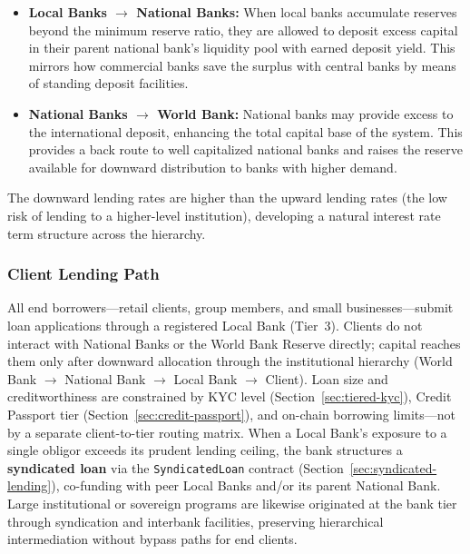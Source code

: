 \documentclass[12pt,a4paper]{report}
\begin{document}
\begin{itemize}[noitemsep]
\item \textbf{Local Banks $\to$ National Banks:} When local banks accumulate reserves beyond the minimum reserve ratio, they are allowed to deposit excess capital in their parent national bank's liquidity pool with earned deposit yield. This mirrors how commercial banks save the surplus with central banks by means of standing deposit facilities.
\item \textbf{National Banks $\to$ World Bank:} National banks may provide excess to the international deposit, enhancing the total capital base of the system. This provides a back route to well capitalized national banks and raises the reserve available for downward distribution to banks with higher demand.
\end{itemize}

The downward lending rates are higher than the upward lending rates (the low risk of lending to a higher-level institution), developing a natural interest rate term structure across the hierarchy.

\subsubsection{Client Lending Path}

All end borrowers---retail clients, group members, and small businesses---submit loan applications through a registered Local Bank (Tier~3). Clients do not interact with National Banks or the World Bank Reserve directly; capital reaches them only after downward allocation through the institutional hierarchy (World Bank $\to$ National Bank $\to$ Local Bank $\to$ Client). Loan size and creditworthiness are constrained by KYC level (Section~\ref{sec:tiered-kyc}), Credit Passport tier (Section~\ref{sec:credit-passport}), and on-chain borrowing limits---not by a separate client-to-tier routing matrix. When a Local Bank's exposure to a single obligor exceeds its prudent lending ceiling, the bank structures a \textbf{syndicated loan} via the \texttt{SyndicatedLoan} contract (Section~\ref{sec:syndicated-lending}), co-funding with peer Local Banks and/or its parent National Bank. Large institutional or sovereign programs are likewise originated at the bank tier through syndication and interbank facilities, preserving hierarchical intermediation without bypass paths for end clients.
\end{document}
